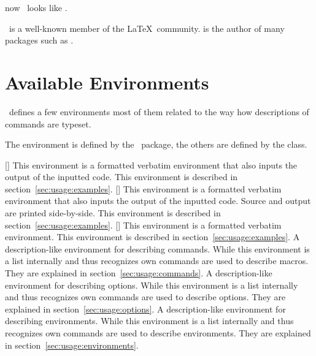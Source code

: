 \documentclass[load-preamble]{cnltx-doc}
\begin{document}
\begin{example}
  now \foothree\ looks like \cnltx.

  \newname{}%
  \carlisle\ is a well-known member of the \LaTeX\ community.  \carlisle* is
  the author of many packages such as .
\end{example}

\section{Available Environments}\label{sec:envs}

\cnltx\ defines a few environments most of them related to the way how
descriptions of commands are typeset.

The  environment is defined by the \cnltx\ package, the
others are defined by the class.

\begin{environments}
  []
    This environment is a formatted verbatim environment that also inputs the
    output of the inputted code.  This environment is described in
    section~\ref{sec:usage:examples}.
  []
    This environment is a formatted verbatim environment that also inputs the
    output of the inputted code.  Source and output are printed side-by-side.
    This environment is described in section~\ref{sec:usage:examples}.
  []
    This environment is a formatted verbatim environment.  This environment is
    described in section~\ref{sec:usage:examples}.
    A description-like environment for describing commands.  While this
    environment is a list internally and thus recognizes  own
    commands are used to describe macros.  They are explained in
    section~\ref{sec:usage:commands}.
    A description-like environment for describing options.  While this
    environment is a list internally and thus recognizes  own
    commands are used to describe options.  They are explained in
    section~\ref{sec:usage:options}.
    A description-like environment for describing environments.  While this
    environment is a list internally and thus recognizes  own
    commands are used to describe environments.  They are explained in
    section~\ref{sec:usage:environments}.
\end{environments}
\end{document}
